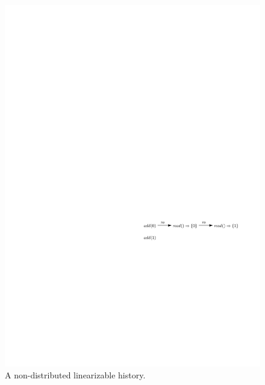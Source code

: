 \begin{figure}[t]
  \centering
  \includegraphics[width=0.6 \textwidth]{figures/PIC-Example-NonLinHis.pdf}
  \caption{A non-distributed linearizable history.}
  \label{fig:a non-distributed linearizable history}
\end{figure}






